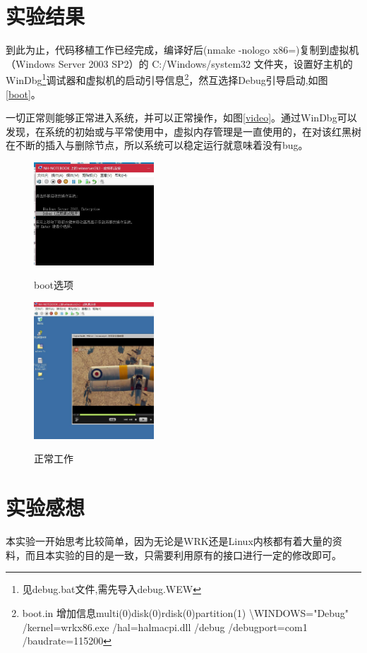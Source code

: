 \section{实验结果}
到此为止，代码移植工作已经完成，编译好后(nmake -nologo x86=)复制到虚拟机（Windows Server 2003 SP2）的 C:/Windows/system32 文件夹，设置好主机的WinDbg\footnote{见debug.bat文件,需先导入debug.WEW}调试器和虚拟机的启动引导信息\footnote{boot.in 增加信息multi(0)disk(0)rdisk(0)partition(1)
\textbackslash WINDOWS="Debug" /kernel=wrkx86.exe /hal=halmacpi.dll /debug /debugport=com1 /baudrate=115200}，然互选择Debug引导启动,如图\autoref{boot}。

一切正常则能够正常进入系统，并可以正常操作，如图\autoref{video}。通过WinDbg可以发现，在系统的初始或与平常使用中，虚拟内存管理是一直使用的，在对该红黑树在不断的插入与删除节点，所以系统可以稳定运行就意味着没有bug。

\begin{figure}
    \centering
    \includegraphics[width=0.4\textwidth]{2.jpg}\\
    \caption{boot选项\label{boot}}
\end{figure}

\begin{figure}
    \centering
    \includegraphics[width=0.4\textwidth]{1.jpg}\\
    \caption{正常工作\label{video}}
\end{figure}

\section{实验感想}
本实验一开始思考比较简单，因为无论是WRK还是Linux内核都有着大量的资料，而且本实验的目的是一致，只需要利用原有的接口进行一定的修改即可。

